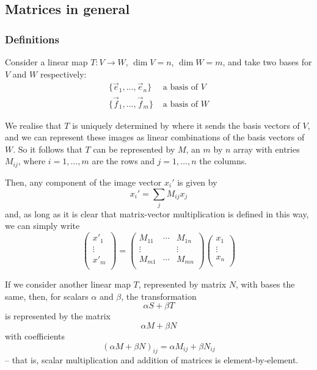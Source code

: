 \documentclass{../../template/note}
\begin{document}
    \subsection{Matrices in general}

    \subsubsection{Definitions}

    Consider a linear map \(T: V \to W\), \(\dim V = n\), \(\dim W = m\), and take two bases for \(V\) and \(W\) respectively:
    \begin{align*}
        \{\vec e_1, \dots, \vec e_n\} &\text{ a basis of } V \\
        \{\vec f_1, \dots, \vec f_m\} &\text{ a basis of } W
    \end{align*}
    
    We realise that \(T\) is uniquely determined by where it sends the basis vectors of \(V\), and we can represent these images as linear combinations of the basis vectors of \(W\). So it follows that \(T\) can be represented by \(M\), an \(m\) by \(n\) array with entries \(M_{ij}\), where \(i = 1, \dots, m\) are the rows and \(j = 1, \dots, n\) the columns.
    
    Then, any component of the image vector \(x_i'\) is given by
    \[
        x_i' = \sum_j M_{ij} x_j
    \]
    and, as long as it is clear that matrix-vector multiplication is defined in this way, we can simply write
    \[
        \begin{pmatrix}
         x'_1 \\
         \vdots \\
         x'_m \\
        \end{pmatrix} =
        \begin{pmatrix}
         M_{11} & \cdots & M_{1n} \\
         \vdots &  & \vdots \\
         M_{m1} & \cdots & M_{mn} \\
        \end{pmatrix}
        \begin{pmatrix}
         x_1 \\
         \vdots \\
         x_n \\
        \end{pmatrix}
    \]
    
    If we consider another linear map \(T\), represented by matrix \(N\), with bases the same, then, for scalars \(\alpha\) and \(\beta\), the transformation
    \[
        \alpha S + \beta T
    \]
    is represented by the matrix
    \[
        \alpha M + \beta N
    \]
    with coefficients
    \[
        (\alpha M + \beta N)_{ij} = \alpha M_{ij} + \beta N_{ij}
    \]
    -- that is, scalar multiplication and addition of matrices is element-by-element.
\end{document}
